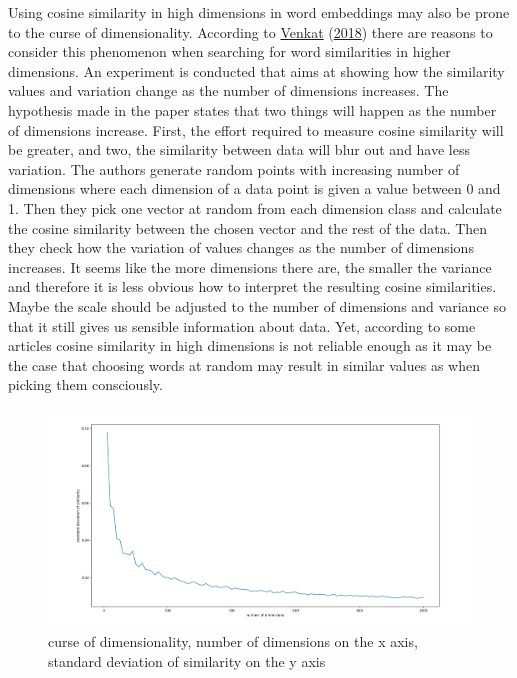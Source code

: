 \documentclass[
  12pt,
]{book}
\begin{document}
Using cosine similarity in high dimensions in word embeddings may also be prone to the curse of dimensionality. According to \protect\hyperlink{ref-Venkat2018Curse}{Venkat} (\protect\hyperlink{ref-Venkat2018Curse}{2018}) there are reasons to consider this phenomenon when searching for word similarities in higher dimensions. An experiment is conducted that aims at showing how the similarity values and variation change as the number of dimensions increases. The hypothesis made in the paper states that two things will happen as the number of dimensions increase. First, the effort required to measure cosine similarity will be greater, and two, the similarity between data will blur out and have less variation. The authors generate random points with increasing number of dimensions where each dimension of a data point is given a value between 0 and 1. Then they pick one vector at random from each dimension class and calculate the cosine similarity between the chosen vector and the rest of the data. Then they check how the variation of values changes as the number of dimensions increases. It seems like the more dimensions there are, the smaller the variance and therefore it is less obvious how to interpret the resulting cosine similarities. Maybe the scale should be adjusted to the number of dimensions and variance so that it still gives us sensible information about data. Yet, according to some articles cosine similarity in high dimensions is not reliable enough as it may be the case that choosing words at random may result in similar values as when picking them consciously.

\begin{figure}
\centering
\includegraphics{../images/curseOfDimensionality.png}
\caption{curse of dimensionality, number of dimensions on the x axis, standard deviation of similarity on the y axis}
\end{figure}
\end{document}
